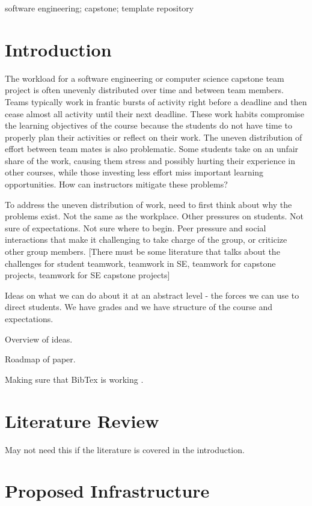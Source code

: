 \documentclass[10pt, conference]{IEEEtran}
\begin{document}
\begin{IEEEkeywords}
software engineering; capstone; template repository
\end{IEEEkeywords}

\section{Introduction} \label{SecIntro}

The workload for a software engineering or computer science capstone team
project is often unevenly distributed over time and between team members.  Teams
typically work in frantic bursts of activity right before a deadline and then
cease almost all activity until their next deadline.  These work habits
compromise the learning objectives of the course because the students do not
have time to properly plan their activities or reflect on their work.  The
uneven distribution of effort between team mates is also problematic.  Some
students take on an unfair share of the work, causing them stress and possibly
hurting their experience in other courses, while those investing less effort
miss important learning opportunities.  How can instructors mitigate these
problems?

To address the uneven distribution of work, need to first think about why the
problems exist.  Not the same as the workplace.  Other pressures on students.
Not sure of expectations.  Not sure where to begin.  Peer pressure and social
interactions that make it challenging to take charge of the group, or criticize
other group members.  [There must be some literature that talks about the
challenges for student teamwork, teamwork in SE, teamwork for capstone projects,
teamwork for SE capstone projects]

Ideas on what we can do about it at an abstract level - the forces we can use to
direct students.  We have grades and we have structure of the course and
expectations.

Overview of ideas.

Roadmap of paper.

Making sure that BibTex is working \cite{Smith2005}.

\section{Literature Review} \label{SecLitReview}
May not need this if the literature is covered in the introduction.

\section{Proposed Infrastructure} \label{SecInfrastruct}
\end{document}
